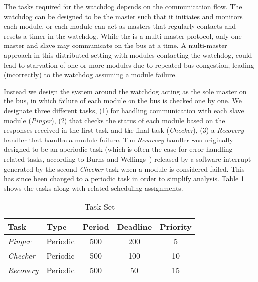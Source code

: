 The tasks required for the watchdog depends on the communication flow. The watchdog can be designed to be the master such that it initiates and monitors each module, or each module can act as masters that regularly contacts and resets a timer in the watchdog. While the \iic is a multi-master protocol, only one master and slave may communicate on the bus at a time.
A multi-master approach in this distributed setting with modules contacting the watchdog, could lead to starvation of one or more modules due to repeated bus congestion, leading (incorrectly) to the watchdog assuming a module failure.

Instead we design the system around the watchdog acting as the sole master on the bus, in which failure of each module on the bus is checked one by one. We designate three different tasks, (1) for handling \iic communication with each slave module (\textit{Pinger}), (2) that checks the status of each module based on the responses received in the first task and the final task (\textit{Checker}), (3) a \textit{Recovery} handler that handles a module failure. The \textit{Recovery} handler was originally designed to be an aperiodic task (which is often the case for error handling related tasks, according to Burns and Wellings~\cite{alan2001real}) released by a software interrupt generated by the second \textit{Checker} task when a module is considered failed. This has since been changed to a periodic task in order to simplify analysis. Table \ref{tab:taskslol} shows the tasks along with related scheduling assignments.
\begin{table}
\centering
\begin{tabular}{ | l | l | c | c | c |}
\hline
Task & Type & Period & Deadline & Priority  \\ \hline
\textit{Pinger} & Periodic & 500 & 200 & 5  \\ \hline
\textit{Checker} & Periodic & 500 & 100 & 10 \\ \hline
\textit{Recovery} & Periodic & 500 & 50 &  15 \\
\hline
\end{tabular}
 \caption{Task Set}
 \label{tab:taskslol}
\end{table}

